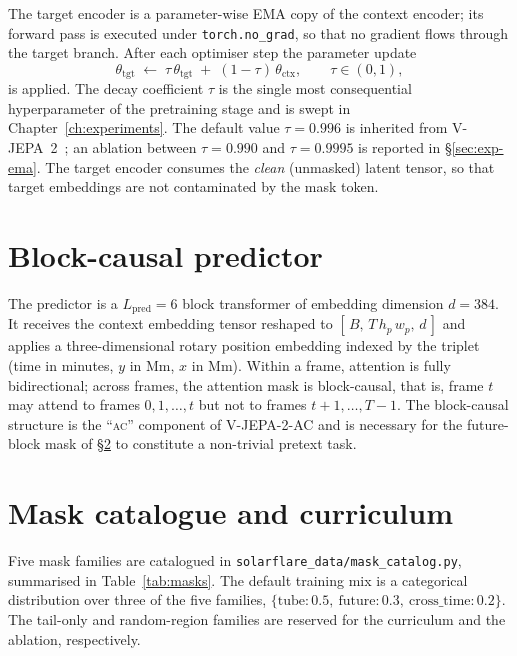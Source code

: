 The target encoder is a parameter-wise EMA copy of the context
encoder; its forward pass is executed under
\texttt{torch.no\_grad}, so that no gradient flows through the target
branch. After each optimiser step the parameter update
\begin{equation}
\theta_{\text{tgt}} \;\leftarrow\; \tau \,\theta_{\text{tgt}}
\;+\; (1-\tau)\,\theta_{\text{ctx}},
\qquad \tau \in (0,1),
\label{eq:ema}
\end{equation}
is applied. The decay coefficient $\tau$ is the
single most consequential hyperparameter of the pretraining stage and
is swept in Chapter~\ref{ch:experiments}. The default value
$\tau = 0.996$ is inherited from V-JEPA~2~\cite{vjepa2_2025}; an
ablation between $\tau = 0.990$ and $\tau = 0.9995$ is reported in
\S\ref{sec:exp-ema}. The target encoder consumes the
\emph{clean} (unmasked) latent tensor, so that target embeddings are
not contaminated by the mask token.

\section{Block-causal predictor}
\label{sec:arch-pred}

The predictor is a $L_{\text{pred}} = 6$ block transformer of
embedding dimension $d = 384$. It receives the context embedding
tensor reshaped to $[\,B,\, T\,h_{p}\,w_{p},\, d\,]$ and applies a
three-dimensional rotary position embedding indexed by the triplet
(time in minutes, $y$ in Mm, $x$ in Mm). Within a frame, attention
is fully bidirectional; across frames, the attention mask is
block-causal, that is, frame $t$ may attend to frames $0,1,\ldots,t$
but not to frames $t+1,\ldots,T-1$. The block-causal structure is
the ``\textsc{ac}'' component of V-JEPA-2-AC and is necessary for
the future-block mask of \S\ref{sec:arch-mask} to constitute a
non-trivial pretext task.

\section{Mask catalogue and curriculum}
\label{sec:arch-mask}

Five mask families are catalogued in
\texttt{solarflare\_data/mask\_catalog.py}, summarised in
Table~\ref{tab:masks}. The default training mix is a categorical
distribution over three of the five families, $\{\text{tube}:0.5,\
\text{future}:0.3,\ \text{cross\_time}:0.2\}$. The tail-only and
random-region families are reserved for the curriculum and the
ablation, respectively.

